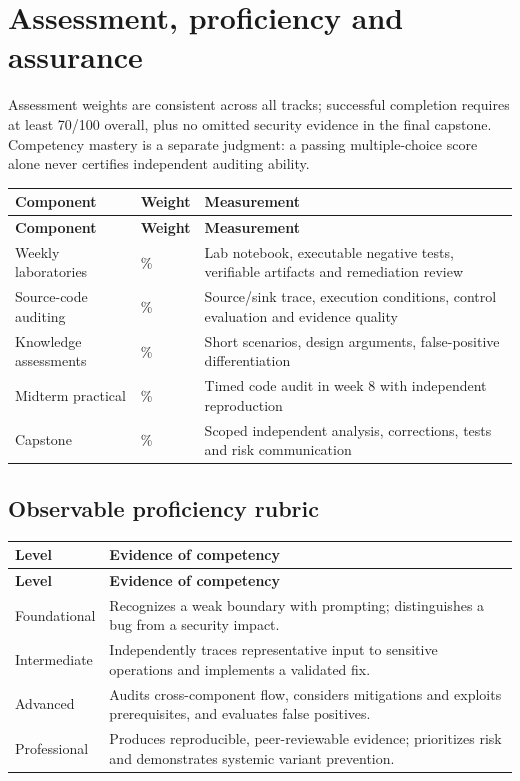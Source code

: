 \documentclass[10pt,letterpaper]{article}
\begin{document}
\section{Assessment, proficiency and assurance}
Assessment weights are consistent across all tracks; successful completion requires at least 70/100 overall, plus no omitted security evidence in the final capstone. Competency mastery is a separate judgment: a passing multiple-choice score alone never certifies independent auditing ability.

\begingroup\footnotesize\setlength\tabcolsep{3pt}
\begin{longtable}{>{\raggedright\arraybackslash}p{}>{\raggedright\arraybackslash}p{}>{\raggedright\arraybackslash}p{}}\toprule
\textbf{Component} & \textbf{Weight} & \textbf{Measurement}\\\midrule\endfirsthead
\toprule \textbf{Component} & \textbf{Weight} & \textbf{Measurement}\\\midrule\endhead
Weekly laboratories & 30\% & Lab notebook, executable negative tests, verifiable artifacts and remediation review\\\midrule
Source-code auditing & 20\% & Source/sink trace, execution conditions, control evaluation and evidence quality\\\midrule
Knowledge assessments & 15\% & Short scenarios, design arguments, false-positive differentiation\\\midrule
Midterm practical & 10\% & Timed code audit in week 8 with independent reproduction\\\midrule
Capstone & 25\% & Scoped independent analysis, corrections, tests and risk communication\\\midrule
\bottomrule\end{longtable}\endgroup
\subsection{Observable proficiency rubric}
\begingroup\footnotesize\setlength\tabcolsep{3pt}
\begin{longtable}{>{\raggedright\arraybackslash}p{}>{\raggedright\arraybackslash}p{}}\toprule
\textbf{Level} & \textbf{Evidence of competency}\\\midrule\endfirsthead
\toprule \textbf{Level} & \textbf{Evidence of competency}\\\midrule\endhead
Foundational & Recognizes a weak boundary with prompting; distinguishes a bug from a security impact.\\\midrule
Intermediate & Independently traces representative input to sensitive operations and implements a validated fix.\\\midrule
Advanced & Audits cross-component flow, considers mitigations and exploits prerequisites, and evaluates false positives.\\\midrule
Professional & Produces reproducible, peer-reviewable evidence; prioritizes risk and demonstrates systemic variant prevention.\\\midrule
\bottomrule\end{longtable}\endgroup
\end{document}
